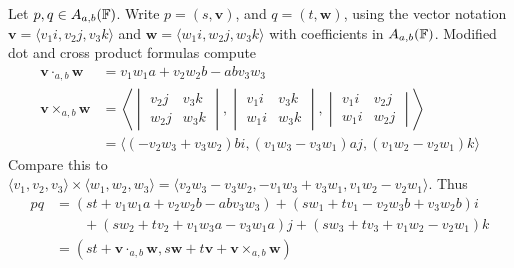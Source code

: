 \documentclass{amsart}
\begin{document}
\begin{defn}
    Let $p, q \in A_{a,b}(\protect\mathbb{F})$. Write $p = (s, \mathbf{v})$, and $q = (t, \mathbf{w})$, using the vector notation $\mathbf{v} = \langle v_1i, v_2j, v_3k \rangle$ and $\mathbf{w} = \langle w_1i, w_2j, w_3k \rangle$ with coefficients in $A_{a,b}(\protect\mathbb{F})$. Modified dot and cross product formulas compute
    \begin{align*}
        \mathbf{v} \cdot_{a,b}  \mathbf{w} &= v_1w_1a + v_2w_2b -abv_3w_3 \\
        \mathbf{v} \times_{a,b} \mathbf{w} &=
            \left\langle\begin{vmatrix}
                v_2j & v_3k \\
                w_2j & w_3k
            \end{vmatrix},
            \begin{vmatrix}
                v_1i & v_3k \\
                w_1i & w_3k
            \end{vmatrix},
            \begin{vmatrix}
                v_1i & v_2j \\
                w_1i & w_2j
            \end{vmatrix}\right\rangle \\
                                            &= \langle (-v_2w_3 + v_3w_2)bi , (v_1w_3 - v_3w_1)aj, (v_1w_2 - v_2w_1)k \rangle
    \end{align*}
    Compare this to $\langle v_1, v_2, v_3 \rangle \times \langle w_1, w_2, w_3 \rangle = \langle v_2w_3 - v_3w_2, -v_1w_3 + v_3w_1, v_1w_2 - v_2w_1 \rangle$. Thus 
    \begin{align*}
        pq &= (st + v_1w_1a + v_2w_2b -abv_3w_3) + (sw_1 + tv_1 - v_2w_3b + v_3w_2b)i \\
           &\qquad + (sw_2 + tv_2 + v_1w_3a-v_3w_1a)j + (sw_3 + tv_3 + v_1w_2 - v_2w_1)k \\
           &= (st + \mathbf{v} \cdot_{a,b} \mathbf{w}, s\mathbf{w} + t\mathbf{v} + \mathbf{v} \times_{a,b} \mathbf{w})
    \end{align*}
\end{defn}
\end{document}
